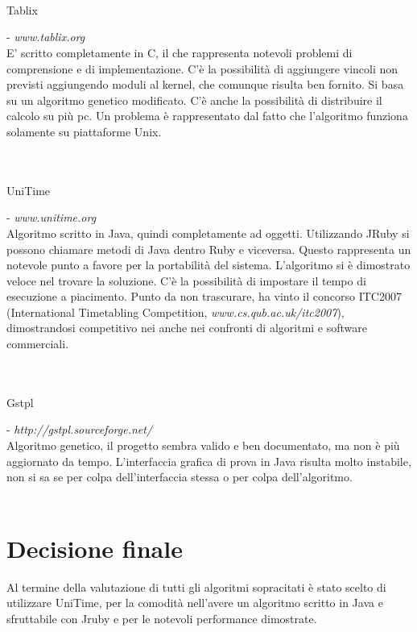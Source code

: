 \documentclass[11pt,a4paper]{article}
\begin{document}
\\ \\ \\
\begin{LARGE}Tablix\end{LARGE} - \textit{www.tablix.org}
\\
E' scritto completamente in C, il che rappresenta notevoli problemi di comprensione e di implementazione.
C'è la possibilità di aggiungere vincoli non previsti aggiungendo moduli al kernel, che comunque risulta ben fornito. Si basa su un algoritmo genetico modificato. C'è anche la possibilità di distribuire il calcolo su più pc. Un problema è rappresentato dal fatto che l'algoritmo funziona solamente su piattaforme Unix.
\\ \\ \\
\begin{LARGE}UniTime\end{LARGE} - \textit{www.unitime.org}
\\
Algoritmo scritto in Java, quindi completamente ad oggetti. Utilizzando JRuby si possono chiamare metodi di Java dentro Ruby e viceversa. Questo rappresenta un notevole punto a favore per la portabilità del sistema. L'algoritmo si è dimostrato veloce nel trovare la soluzione. C'è la possibilità di impostare il tempo di esecuzione a piacimento. Punto da non trascurare, ha vinto il concorso ITC2007 (International Timetabling Competition, \textit{www.cs.qub.ac.uk/itc2007}), dimostrandosi competitivo nei anche nei confronti di algoritmi e software commerciali.
\\ \\ \\
\begin{LARGE}Gstpl\end{LARGE} - \textit{http://gstpl.sourceforge.net/}
\\
Algoritmo genetico, il progetto sembra valido e ben documentato, ma non è più aggiornato da tempo. L'interfaccia grafica di prova in Java risulta molto instabile, non si sa se per colpa dell'interfaccia stessa o per colpa dell'algoritmo.
\\ \\
\section{Decisione finale}
Al termine della valutazione di tutti gli algoritmi sopracitati è stato scelto di utilizzare UniTime, per la comodità nell'avere un algoritmo scritto in Java e sfruttabile con Jruby e per le notevoli performance dimostrate.
\end{document}
